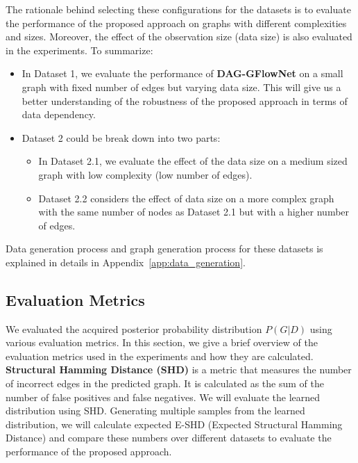 \documentclass{lxaiproposal}
\begin{document}
    The rationale behind selecting these configurations for the datasets is to evaluate the performance of the proposed
    approach on graphs with different complexities and sizes. Moreover, the effect of the observation size (data
    size) is also evaluated in the experiments. To summarize:
    \begin{itemize}
        \item In Dataset 1, we evaluate the performance of \textbf{DAG-GFlowNet} on a small graph with fixed number
        of edges but varying data size. This will give us a better understanding of the robustness of the proposed
        approach in terms of data dependency.
        \item Dataset 2 could be break down into two parts:
        \begin{itemize}
            \item In Dataset 2.1, we evaluate the effect of the data size on a medium sized graph with low complexity (low number of edges).
            \item Dataset 2.2 considers the effect of data size on a more complex graph with the same number of
            nodes as Dataset 2.1 but with a higher number of edges.
        \end{itemize}
    \end{itemize}

    Data generation process and graph generation process for these datasets is explained in details in Appendix~\ref{app:data_generation}.

    \subsection{Evaluation Metrics}
    \vspace*{-3mm}

    We evaluated the acquired posterior probability distribution $P(G|D)$ using various evaluation metrics. In this
    section, we give a brief overview of the evaluation metrics used in the experiments and how they are calculated.
    \vspace*{3mm}
    \textbf{Structural Hamming Distance (SHD)} is a metric that measures the number of incorrect edges in the
    predicted graph. It is calculated as the sum of the number of false positives and false negatives. We will
    evaluate the learned distribution using SHD. Generating multiple samples from the learned distribution,
    we will calculate expected E-SHD (Expected Structural Hamming Distance) and compare these numbers over different
    datasets to evaluate the performance of the proposed approach.
\end{document}
